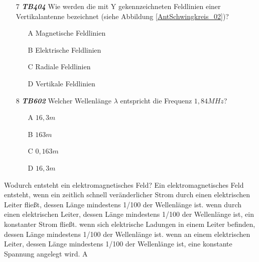 \begin{enumerate} 
\itemsep1pt\parskip0pt
\item[7] \emph{\textbf{TB404}} Wie werden die mit Y gekennzeichneten Feldlinien einer Vertikalantenne bezeichnet (siehe Abbildung \ref{AntSchwingkreis_02})?
	\begin{enumerate}
	\itemsep1pt\parskip0pt
		\item[A] Magnetische Feldlinien
		\item[B] Elektrische Feldlinien
		\item[C] Radiale Feldlinien
		\item[D] Vertikale Feldlinien
	\end{enumerate}
\end{enumerate}

\begin{enumerate} 
\itemsep1pt\parskip0pt
\item[8] \emph{\textbf{TB602}} Welcher Wellenlänge $\lambda$ entspricht die Frequenz $1,84 MHz$?
	\begin{enumerate}
	\itemsep1pt\parskip0pt
		\item[A] $16,3m$
		\item[B] $163m$
		\item[C] $0,163m$
		\item[D] $16,3m$
	\end{enumerate}
\end{enumerate}

{ Wodurch entsteht ein elektromagnetisches Feld? 
Ein elektromagnetisches Feld entsteht,}%
{wenn ein zeitlich schnell veränderlicher Strom durch einen elektrischen Leiter fließt, dessen Länge mindestens 1/100 der Wellenlänge ist.}%
{	wenn durch einen elektrischen Leiter, dessen Länge mindestens 1/100 der Wellenlänge ist, ein konstanter Strom fließt.}%
{wenn sich elektrische Ladungen in einem Leiter befinden, dessen Länge mindestens 1/100 der Wellenlänge ist.}%
{	wenn an einem elektrischen Leiter, dessen Länge mindestens 1/100 der Wellenlänge ist, eine konstante Spannung angelegt wird.}%
{A}%